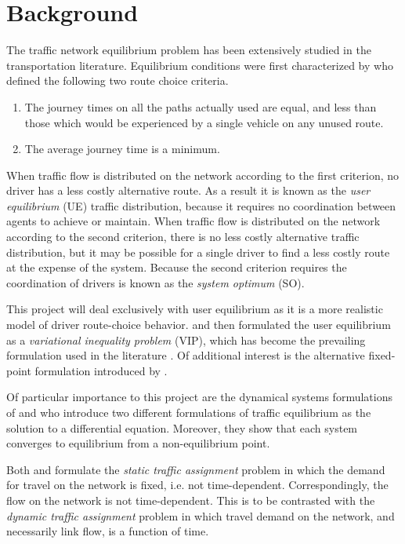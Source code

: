 \section{Background}\label{sec:background}

The traffic network equilibrium problem has been extensively studied in the transportation literature.
Equilibrium conditions were first characterized by \citet{wardrop1952some} who defined the following two route choice criteria.

\begin{enumerate}
    \item The journey times on all the paths actually used are equal, and less than those which would be experienced by a single vehicle on any unused route.
    \item The average journey time is a minimum.
\end{enumerate}

When traffic flow is distributed on the network according to the first criterion, no driver has a less costly alternative route.
As a result it is known as the \textit{user equilibrium} (UE) traffic distribution, because it requires no coordination between agents to achieve or maintain.
When traffic flow is distributed on the network according to the second criterion, there is no less costly alternative traffic distribution, but it may be possible for a single driver to find a less costly route at the expense of the system.
Because the second criterion requires the coordination of drivers is known as the \textit{system optimum} (SO).

This project will deal exclusively with user equilibrium as it is a more realistic model of driver route-choice behavior.
\citet{smith1979existence} and \citet{dafermos1980traffic} then formulated the user equilibrium as a \textit{variational inequality problem} (VIP), which has become the prevailing formulation used in the literature \citep{nagurney2009netecon}.
Of additional interest is the alternative fixed-point formulation introduced by \citet{smith1979existence}.

Of particular importance to this project are the dynamical systems formulations of \citet{nagurney1997projected} and \citet{smith1984stability} who introduce two different formulations of traffic equilibrium as the solution to a differential equation. Moreover, they show that each system converges to equilibrium from a non-equilibrium point.

Both \citet{smith1979existence} and \citet{dafermos1980traffic} formulate the \textit{static traffic assignment} problem in which the demand for travel on the network is fixed, i.e. not time-dependent.
Correspondingly, the flow on the network is not time-dependent.
This is to be contrasted with the \textit{dynamic traffic assignment} problem in which travel demand on the network, and necessarily link flow, is a function of time. 

